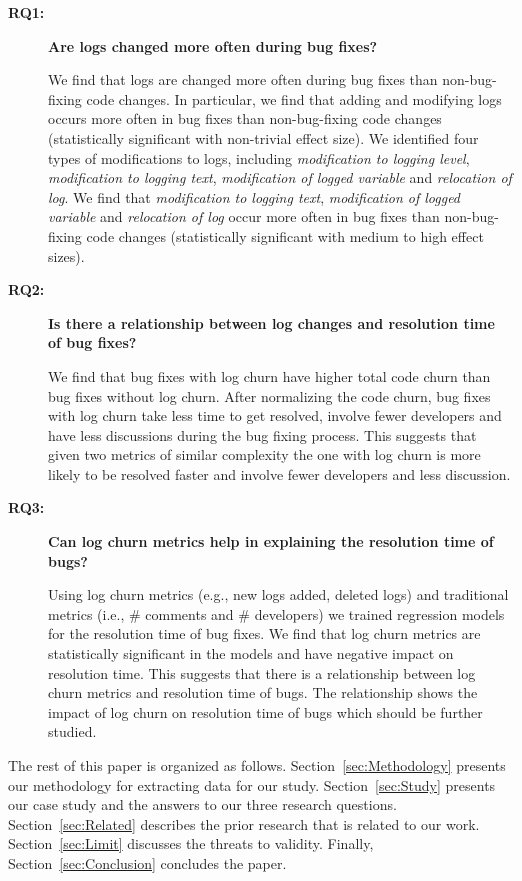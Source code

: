 \begin{description}
\item[\textbf{RQ1:}]\textbf{Are logs changed more often during bug fixes?} 

We find that logs are changed more often during bug fixes than non-bug-fixing code changes. In particular, we find that adding and modifying logs occurs more often in bug fixes than non-bug-fixing code changes (statistically significant with non-trivial effect size). We identified four types of modifications to logs, including \emph{modification to logging level}, \emph{modification to logging text}, \emph{modification of logged variable} and \emph{relocation of log}. We find that \emph{modification to logging text}, \emph{modification of logged variable} and \emph{relocation of log} occur more often in bug fixes than non-bug-fixing code changes (statistically significant with medium to high effect sizes). 



\item[\textbf{RQ2:}]\textbf{Is there a relationship between log changes and resolution time of bug fixes?}

We find that bug fixes with log churn have higher total code churn than bug fixes without log churn. After normalizing the code churn, bug fixes with log churn take less time to get resolved, involve fewer developers and have less discussions during the bug fixing process. This suggests that given two metrics of similar complexity the one with log churn is more likely to be resolved faster and involve fewer developers and less discussion. 


\item[\textbf{RQ3:}]\textbf{Can log churn metrics help in explaining the resolution time of bugs?}

Using log churn metrics (e.g., new logs added, deleted logs) and traditional metrics (i.e., \# comments and \# developers) we trained regression models for the resolution time of bug fixes. We find that log churn metrics are statistically significant in the models and have negative impact on resolution time. This suggests that there is a relationship between log churn metrics and resolution time of bugs. The relationship shows the impact of log churn on resolution time of bugs which should be further studied. 

\end{description}


The rest of this paper is organized as follows. Section~\ref{sec:Methodology} presents our methodology for extracting data for our study. Section~\ref{sec:Study} presents our case study and the answers to our three research questions. Section~\ref{sec:Related} describes the prior research that is related to our work. Section~\ref{sec:Limit}  discusses the threats to validity. Finally, Section~\ref{sec:Conclusion} concludes the paper.


